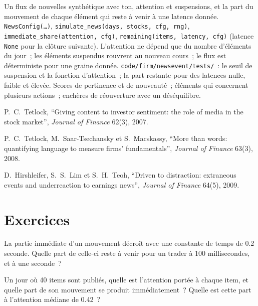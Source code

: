 \begin{build}
 Un flux de nouvelles synthétique avec ton, attention et suspensions, et la part du mouvement de chaque élément qui reste à venir à une latence donnée.
 \texttt{NewsConfig(\dots)}, \texttt{simulate\_news(days, stocks, cfg, rng)}, \texttt{immediate\_share(attention, cfg)},
\texttt{remaining(items, latency, cfg)} (latence \texttt{None} pour la clôture suivante).
 L'attention ne dépend que du nombre d'éléments du jour~; les éléments suspendus rouvrent au nouveau cours~; le flux est déterministe pour une graine donnée.
 \texttt{code/firm/newsevent/tests/}~: le seuil de suspension et la fonction d'attention~; la part restante pour des latences nulle, faible et
élevée.
 Scores de pertinence et de nouveauté~; éléments qui concernent plusieurs actions~; enchères de réouverture avec un déséquilibre.
\end{build}

\begin{omsources}
\item P.~C.~Tetlock, ``Giving content to investor sentiment: the role of media in the stock market'', \emph{Journal of Finance} 62(3), 2007.
\item P.~C.~Tetlock, M.~Saar-Tsechansky et S.~Macskassy, ``More than words: quantifying language to measure firms' fundamentals'', \emph{Journal of
Finance} 63(3), 2008.
\item D.~Hirshleifer, S.~S.~Lim et S.~H.~Teoh, ``Driven to distraction: extraneous events and underreaction to earnings news'', \emph{Journal of
Finance} 64(5), 2009.
\end{omsources}

\section{Exercices}

\begin{exercise}[$\star$]\label{exo:s1:news-and-events:1}
La partie immédiate d'un mouvement décroît avec une constante de temps de 0.2 seconde. Quelle part de celle-ci reste à venir pour un trader à 100 millisecondes, et à une
seconde~?
\end{exercise}

\begin{exercise}[$\star$]\label{exo:s1:news-and-events:2}
Un jour où 40 items sont publiés, quelle est l'attention portée à chaque item, et quelle part de son mouvement se produit immédiatement~? Quelle est cette part à l'attention médiane de 0.42~?
\end{exercise}


